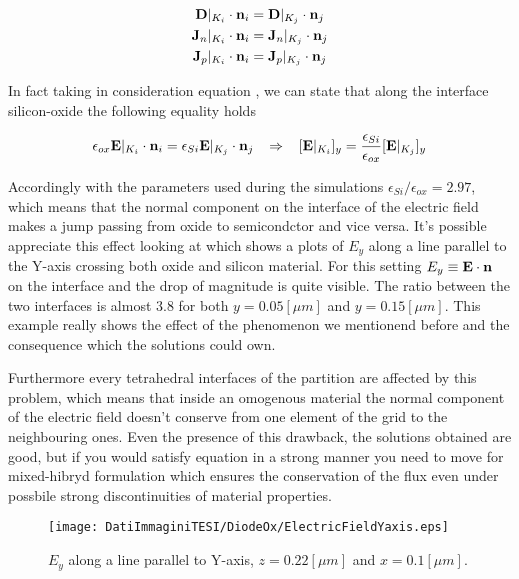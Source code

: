 \begin{align}
\mathbf{D}|_{K_i}\cdot \mathbf{n}_{i} & = \mathbf{D}|_{K_j} \cdot \mathbf{n}_{j} \label{eq: conservazione vettore spostamento}\\
\mathbf{J}_n|_{K_i}\cdot \mathbf{n}_{i} & = \mathbf{J}_n|_{K_j}\cdot \mathbf{n}_{j} \\
\mathbf{J}_p|_{K_i}\cdot \mathbf{n}_{i} & = \mathbf{J}_p|_{K_j}\cdot \mathbf{n}_{j} 
\end{align}


In fact taking in consideration equation , we can state that along the interface silicon-oxide the following equality holds

\begin{equation}
\epsilon_{ox}\vect{E}|_{K_i}\cdot \vect{n}_{i} = \epsilon_{Si}\vect{E}|_{K_j} \cdot \vect{n}_{j} \psp{5} \Rightarrow \psp{5}  [\vect{E}|_{K_i}]_y = \dfrac{\epsilon_{Si}}{\epsilon_{ox}}[\vect{E}|_{K_j}]_y
\end{equation}  

Accordingly with the parameters used during the simulations $\epsilon_{Si}/\epsilon_{ox}=2.97$, which means that the normal component on the interface of the electric field makes a jump passing from oxide to semicondctor and vice versa. It's possible appreciate this effect looking at  which shows a plots of $E_y$ along a line parallel to the Y-axis crossing both oxide and silicon material. For this setting $E_y\equiv\mathbf{E}\cdot \mathbf{n}$ on the interface and the drop of magnitude is quite visible. The ratio between the two interfaces is almost $3.8$ for both $y=0.05[\mu m]$ and $y = 0.15[\mu m]$.
This example really shows the effect of the phenomenon we mentionend before and the consequence which the solutions could own.

 Furthermore every tetrahedral interfaces of the partition are affected by this problem, which means that inside an omogenous material the normal component of the electric field doesn't conserve from one element of the grid to the neighbouring ones. Even the presence of this drawback, the solutions obtained are good, but if you would satisfy equation  in a strong manner you need to move for mixed-hibryd formulation which ensures the conservation of the flux even under possbile strong discontinuities of material properties.


\begin{figure}[!h]
\centering
\texttt{[image: DatiImmaginiTESI/DiodeOx/ElectricFieldYaxis.eps]}
\caption{$E_y$ along a line parallel to Y-axis, $z=0.22[\mu m]$ and $x=0.1[\mu m]$.}
\label{fig: salto electric field}
\end{figure}


